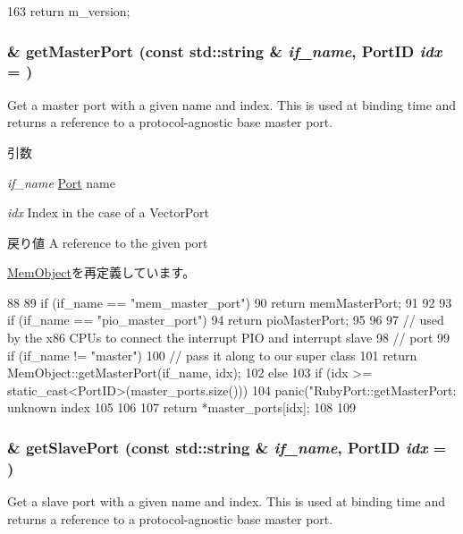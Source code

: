 \begin{DoxyCode}
163 { return m_version; }
\end{DoxyCode}
\hypertarget{classRubyPort_adc4e675e51defbdd1e354dac729d0703}{
\subsubsection[{getMasterPort}]{ \& getMasterPort (const std::string \& {\em if\_\-name}, \/  {\bf PortID} {\em idx} = {})}}
\label{classRubyPort_adc4e675e51defbdd1e354dac729d0703}
Get a master port with a given name and index. This is used at binding time and returns a reference to a protocol-\/agnostic base master port.


\begin{DoxyParams}{引数}
\item[{\em if\_\-name}]\hyperlink{classPort}{Port} name \item[{\em idx}]Index in the case of a VectorPort\end{DoxyParams}
\begin{DoxyReturn}{戻り値}
A reference to the given port 
\end{DoxyReturn}


\hyperlink{classMemObject_adc4e675e51defbdd1e354dac729d0703}{MemObject}を再定義しています。


\begin{DoxyCode}
88 {
89     if (if_name == "mem_master_port") {
90         return memMasterPort;
91     }
92 
93     if (if_name == "pio_master_port") {
94         return pioMasterPort;
95     }
96 
97     // used by the x86 CPUs to connect the interrupt PIO and interrupt slave
98     // port
99     if (if_name != "master") {
100         // pass it along to our super class
101         return MemObject::getMasterPort(if_name, idx);
102     } else {
103         if (idx >= static_cast<PortID>(master_ports.size())) {
104             panic("RubyPort::getMasterPort: unknown index %
105         }
106 
107         return *master_ports[idx];
108     }
109 }
\end{DoxyCode}
\hypertarget{classRubyPort_ac918a145092d7514ebc6dbd952dceafb}{
\subsubsection[{getSlavePort}]{ \& getSlavePort (const std::string \& {\em if\_\-name}, \/  {\bf PortID} {\em idx} = {})}}
\label{classRubyPort_ac918a145092d7514ebc6dbd952dceafb}
Get a slave port with a given name and index. This is used at binding time and returns a reference to a protocol-\/agnostic base master port.



